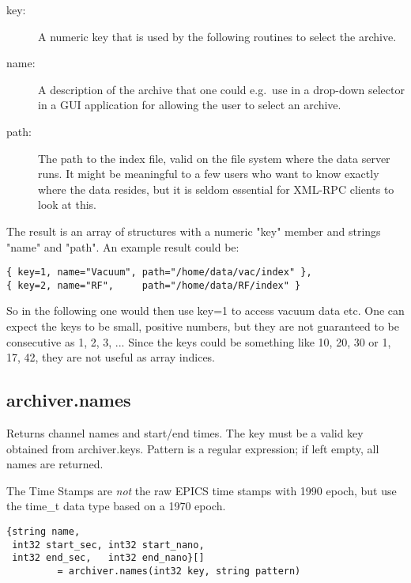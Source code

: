 \begin{description}
\item[\sffamily key:] A numeric key that is used by the following
                      routines to select the archive.
\item[\sffamily name:] A description of the archive that one could
                       e.g.\ use in a drop-down selector in a GUI
                       application for allowing the user to select an archive.
\item[\sffamily path:] The path to the index file, valid on the file
                       system where the data server runs.
                       It might be meaningful to a few users who want to
                       know exactly where the data resides, but it is
                       seldom essential for XML-RPC clients to look at this.
\end{description}

\noindent The result is an array of structures with a numeric "key"
member and strings "name" and "path".
An example result could be:
\begin{lstlisting}[keywordstyle=\sffamily]
{ key=1, name="Vacuum", path="/home/data/vac/index" },
{ key=2, name="RF",     path="/home/data/RF/index" }
\end{lstlisting}

\noindent So in the following one would then use key=1 to access
vacuum data etc. One can expect the keys to be small, positive
numbers, but they are not guaranteed to be consecutive as 1, 2, 3,
... Since the keys could be something like 10, 20, 30 or 1, 17, 42,
they are not useful as array indices.

\subsection{archiver.names} %
Returns channel names and start/end times.
The key must be a valid key obtained from archiver.keys.
Pattern is a regular expression;
if left empty, all names are returned.

\NOTE The Time Stamps are \emph{not} the raw EPICS time stamps with 1990 epoch,
but use the time\_t data type based on a 1970 epoch.

\begin{lstlisting}[keywordstyle=\sffamily]
{string name,
 int32 start_sec, int32 start_nano,
 int32 end_sec,   int32 end_nano}[] 
         = archiver.names(int32 key, string pattern)
\end{lstlisting}

